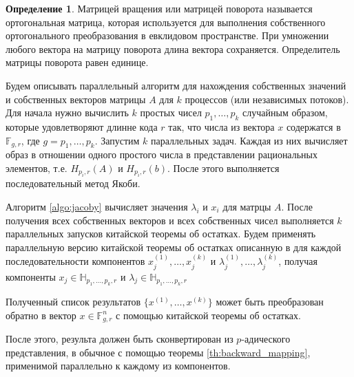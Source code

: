 \documentclass[master, och, diploma, times]{sty/SCWorks}
\theoremstyle{plain}
\theoremstyle{definition}
\newtheorem{defn}{Определение}[section]
\numberwithin{equation}{section}
\begin{document}
\begin{defn}
Матрицей вращения или матрицей поворота называется ортогональная матрица, которая используется для выполнения собственного ортогонального преобразования в евклидовом пространстве. При умножении любого вектора на матрицу поворота длина вектора сохраняется. Определитель матрицы поворота равен единице.
\end{defn}

Будем описывать параллельный алгоритм для нахождения собственных значений и собственных векторов матрицы $A$ для $k$ процессов (или независимых потоков). Для начала нужно вычислить $k$ простых чисел $p_1, \dots, p_k$ случайным образом, которые удовлетворяют длинне кода $r$ так, что числа из вектора $x$ содержатся в $\mathbb{F}_{g,r}$, где $g=p_1,\dots,p_k$. 
Запустим $k$ параллельных задач. Каждая из них вычисляет образ в отношении одного простого числа в представлении рациональных элементов, т.е. $H_{p_i,r}(A)$ и $H_{p_i,r}(b)$. После этого выполняется последовательный метод Якоби.

Алгоритм \ref{algo:jacoby} вычисляет значения $\lambda_i$ и $x_i$ для матрцы $A$. После получения всех собственных векторов и всех собственных чисел выполняется $k$ параллельных запусков китайской теоремы об остатках. Будем применять параллельную версию китайской теоремы об остатках описанную в \cite{bib:numbers:limongelli} для каждой последовательности компонентов $x_j^{(1)}, \dots, x_j^{(k)}$ и $\lambda_j^{(1)}, \dots, \lambda_j^{(k)}$, получая компоненты $x_j \in \mathbb{H}_{p_1,\dots,p_k,r}$ и $\lambda_j \in \mathbb{H}_{p_1,\dots,p_k,r}$

Полученный список результатов $\{x^{(1)},\dots,x^{(k)}\}$ может быть преобразован обратно в вектор $x \in \mathbb{F}_{g,r}^n$ с помощью китайской теоремы об остатках.

После этого, результа должен быть сконвертирован из $p$-адического представления, в обычное с помощью теоремы \ref{th:backward_mapping}, применимой параллельно к каждому из компонентов.
\end{document}

